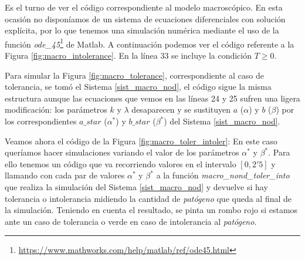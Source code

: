 Es el turno de ver el código correspondiente al modelo macroscópico. En esta ocasión no disponíamos de un sistema de ecuaciones diferenciales con solución explícita, por lo que tenemos una simulación numérica mediante el uso de la función \textit{ode\_45}\footnote{\url{https://www.mathworks.com/help/matlab/ref/ode45.html}} de Matlab. A continuación podemos ver el código referente a la Figura \ref{fig:macro_intolerance}. En la línea $33$ se incluye la condición $T \geq 0$.

Para simular la Figura \ref{fig:macro_tolerance}, correspondiente al caso de tolerancia, se tomó el Sistema \ref{sist_macro_nod}, el código sigue la misma estructura aunque las ecuaciones que vemos en las líneas 24 y 25 sufren una ligera modificación: los parámetros $k$ y $\lambda$ desaparecen y se sustituyen $a$ ($\alpha$) y $b$ ($\beta$) por los correspondientes $a\_star$ ($\alpha ^{*}$) y $b\_star$ ($\beta ^{*}$) del Sistema \ref{sist_macro_nod}. 




Veamos ahora el código de la Figura \ref{fig:macro_toler_intoler}: En este caso queríamos hacer simulaciones variando el valor de los parámetros $\alpha ^{*}$ y $\beta ^{*}$. Para ello tenemos un código que va recorriendo valores en el intervalo $[0, 2'5]$ y llamando con cada par de valores $\alpha ^{*}$ y $\beta ^{*}$ a la función \textit{macro\_nond\_toler\_into} que realiza la simulación del Sistema \ref{sist_macro_nod} y devuelve si hay tolerancia o intolerancia midiendo la cantidad de \textit{patógeno} que queda al final de la simulación. Teniendo en cuenta el resultado, se pinta un rombo rojo si estamos ante un caso de tolerancia o verde en caso de intolerancia al \textit{patógeno}.





